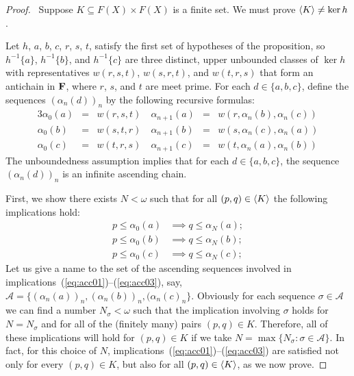 \begin{proof}\
Suppose $K \subseteq F(X) \times F(X)$ is a finite set. 
We must prove $\langle K\rangle \neq \ker h$.

\medskip
{}
  Let $h$, $a$, $b$, $c$, $r$, $s$, $t$, satisfy the first set of hypotheses of the 
proposition, so $h^{-1}\{a\}$, $h^{-1}\{b\}$, and $h^{-1}\{c\}$ are three distinct, 
upper unbounded classes of $\ker h$ with representatives $w(r,s,t)$, $w(s,r,t)$, and 
$w(t,r,s)$ that form an antichain in $\mathbf{F}$, where $r$, $s$, and $t$ are meet 
prime.
For each $d\in \{a, b, c\}$, define the sequences $(\alpha_n(d))_n$
by the following recursive formulas:
\begin{alignat*}{3}
  \alpha_0(a)     &= & w(r,s,t) \quad 
  \alpha_{n+1}(a) &= & w(r,\alpha_n(b),\alpha_n(c))\\
  \alpha_0(b)     &= & w(s,t,r)\quad 
  \alpha_{n+1}(b) &= & w(s,\alpha_n(c),\alpha_n(a))\\
  \alpha_0(c)     &= & w(t,r,s)\quad  
  \alpha_{n+1}(c) &= & w(t,\alpha_n(a),\alpha_n(b))
\end{alignat*}
The unboundedness assumption implies that for each 
$d \in \{a,b,c\}$, the sequence $(\alpha_n(d))_n$ is
an infinite ascending chain.

First, we show there exists $N < \omega$ such that 
for all $(p, q) \in \langle K\rangle$ 
the following implications hold:
\begin{align}
  p \leq \alpha_0(a) &\implies q \leq \alpha_N(a); \label{eq:acc01}\\
  p \leq \alpha_0(b) &\implies q \leq \alpha_N(b); \label{eq:acc02}\\ 
  p \leq \alpha_0(c) &\implies q \leq \alpha_N(c); \label{eq:acc03}
\end{align}
Let us give a name to the set of the ascending 
sequences involved in implications~(\ref{eq:acc01})--(\ref{eq:acc03}), say, 
$\mathcal A = \{(\alpha_n(a))_n, (\alpha_n(b))_n, (\alpha_n(c)_n\}$.
Obviously for each sequence $\sigma \in \mathcal A$
we can find a number $N_\sigma < \omega$ such that the implication involving $\sigma$
holds for $N = N_\sigma$ and for all of the (finitely many) pairs $(p,q) \in K$.  
Therefore, all of these implications will hold for $(p, q) \in K$ if we take 
$N = \max \{N_{\sigma} : \sigma \in \mathcal A\}$. %
In fact, for this choice of $N$, implications~(\ref{eq:acc01})--(\ref{eq:acc03}) 
are satisfied not only for every $(p, q) \in K$, but also for all $(p, q) \in \langle K\rangle$,
as we now prove.


\end{proof}
